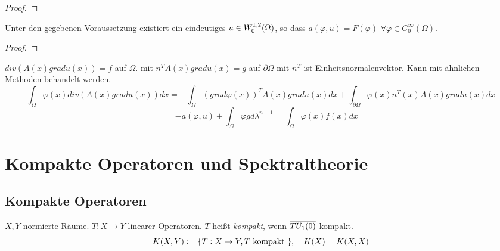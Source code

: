 \documentclass[ngerman]{report}
\begin{document}
	\begin{proof}
		\todor	
	\end{proof}

	\begin{cor}
		Unter den gegebenen Voraussetzung existiert ein eindeutiges $u\in W^{1,2}_0(\Omega)$, so dass $a(\varphi, u) = F(\varphi)$ $\forall \varphi \in C^\infty_0(\Omega)$.
	\end{cor}

	\begin{proof}
		\todor	
	\end{proof}

	\begin{bem}
		$div(A(x)grad u(x)) = f$ auf $\Omega$. mit $n^T A(x) grad u(x) = g$ auf $\partial \Omega$	mit $n^T$ ist Einheitsnormalenvektor. Kann mit ähnlichen Methoden behandelt werden.
		$$\int_\Omega \varphi(x) div (A(x) grad u(x)) dx = - \int_\Omega (grad \varphi(x))^T A(x) gradu(x) dx + \int_{\partial\Omega} \varphi(x) n^T(x) A(x) grad u(x) dx$$ 
	$$ = -a(\varphi, u) + \int_\Omega \varphi g d\lambda^{n-1} = \int_\Omega \varphi(x) f(x) dx$$
	\end{bem}

	\chapter{Kompakte Operatoren und Spektraltheorie}

	\section{Kompakte Operatoren}

	\begin{definition}
		$X,Y$ normierte Räume. $T: X\to Y$ linearer Operatoren. $T$ heißt \textit{kompakt}, wenn 
		$\overline{T U_1(0)}$ kompakt. 
			$$ K(X,Y) := \{T: X\to Y, T \text{ kompakt }\}, \quad K(X) = K(X,X)$$
	\end{definition}
\end{document}
